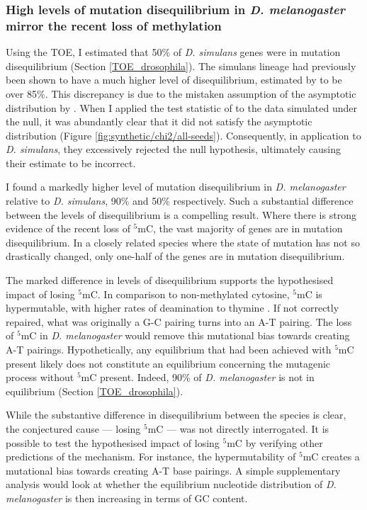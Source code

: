 \subsubsection{High levels of mutation disequilibrium in \textit{D. melanogaster} mirror the recent loss of methylation}
Using the TOE, I estimated that 50\% of \textit{D. simulans} genes were in mutation disequilibrium (Section \ref{TOE_drosophila}). The simulans lineage had previously been shown to have a much higher level of disequilibrium, estimated by \cite{Squartini2008QuantifyingProcess} to be over 85\%. This discrepancy is due to the mistaken assumption of the asymptotic distribution by \cite{Squartini2008QuantifyingProcess}. When I applied the test statistic of \cite{Squartini2008QuantifyingProcess} to the data simulated under the null, it was abundantly clear that it did not satisfy the asymptotic distribution (Figure \ref{fig:synthetic/chi2/all-seeds}). Consequently, in application to \textit{D. simulans}, they excessively rejected the null hypothesis, ultimately causing their estimate to be incorrect.

I found a markedly higher level of mutation disequilibrium in \textit{D. melanogaster} relative to \textit{D. simulans}, 90\% and 50\% respectively. Such a substantial difference between the levels of disequilibrium is a compelling result. Where there is strong evidence of the recent loss of $^5$mC, the vast majority of genes are in mutation disequilibrium. In a closely related species where the state of mutation has not so drastically changed, only one-half of the genes are in mutation disequilibrium.

The marked difference in levels of disequilibrium supports the hypothesised impact of losing $^5$mC. In comparison to non-methylated cytosine, $^5$mC is hypermutable, with higher rates of deamination to thymine \citep{Shen1994TheDNA, Coulondre1978MolecularColi}. If not correctly repaired, what was originally a G-C pairing turns into an A-T pairing. The loss of $^5$mC in \textit{D. melanogaster} would remove this mutational bias towards creating A-T pairings. Hypothetically, any equilibrium that had been achieved with $^5$mC present likely does not constitute an equilibrium concerning the mutagenic process without $^5$mC present. Indeed, 90\% of \textit{D. melanogaster} is not in equilibrium (Section \ref{TOE_drosophila}). 

While the substantive difference in disequilibrium between the species is clear, the conjectured cause --- losing $^5$mC --- was not directly interrogated. It is possible to test the hypothesised impact of losing $^5$mC by verifying other predictions of the mechanism. For instance, the hypermutability of $^5$mC creates a mutational bias towards creating A-T base pairings. A simple supplementary analysis would look at whether the equilibrium nucleotide distribution of \textit{D. melanogaster} is then increasing in terms of GC content. 

